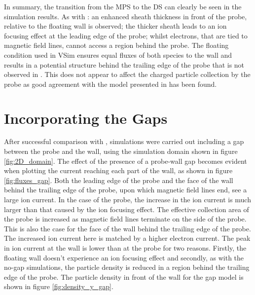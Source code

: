In summary, the transition from the MPS to the DS can clearly be seen in the simulation results. As with \cite{bergmann_1994}: an enhanced sheath thickness in front of the probe, relative to the floating wall is observed; the thicker sheath leads to an ion focusing effect at the leading edge of the probe; whilst electrons, that are tied to magnetic field lines, cannot access a region behind the probe.
The floating condition used in VSim ensures equal fluxes of both species to the wall and results in a potential structure behind the trailing edge of the probe that is not observed in \cite{bergmann_1994}. This does not appear to affect the charged particle collection by the probe as good agreement with the model presented in \cite{Bergmann-2002} has been found.


\section{Incorporating the Gaps}
After successful comparison with \cite{Bergmann-2002}, simulations were carried out including a gap between the probe and the wall, using the simulation domain shown in figure \ref{fig:2D_domain}.  The effect of the presence of a probe-wall gap becomes evident when plotting the current reaching each part of the wall, as shown in figure \ref{fig:fluxes_gap}. Both the leading edge of the probe and the face of the wall behind the trailing edge of the probe, upon which magnetic field lines end, see a large ion current. In the case of the probe, the increase in the ion current is much larger than that caused by the ion focusing effect. The effective collection area of the probe is increased as magnetic field lines terminate on the side of the probe. This is also the case for the face of the wall behind the trailing edge of the probe. The increased ion current here is matched by a higher electron current. The peak in ion current at the wall is lower than at the probe for two reasons. Firstly, the floating wall doesn't experience an ion focusing effect and secondly, as with the no-gap simulations, the particle density is reduced in a region behind the trailing edge of the probe. The particle density in front of the wall for the gap model is shown in figure \ref{fig:density_y_gap}.
